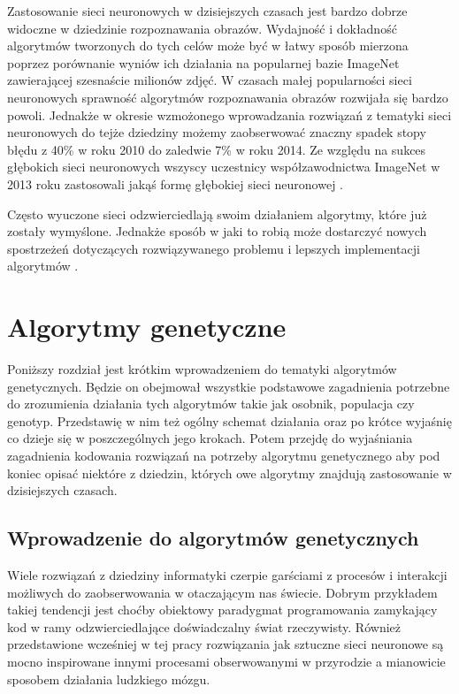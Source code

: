 \documentclass[12pt, oneside, a4paper]{report}
\begin{document}
Zastosowanie sieci neuronowych w dzisiejszych czasach jest bardzo dobrze widoczne w dziedzinie rozpoznawania obrazów. Wydajność i dokładność algorytmów tworzonych do tych celów może być w łatwy sposób mierzona poprzez porównanie wyniów ich działania na popularnej bazie ImageNet \citep{image-net} zawierającej szesnaście milionów zdjęć. W czasach małej popularności sieci neuronowych sprawność algorytmów rozpoznawania obrazów rozwijała się bardzo powoli. Jednakże w okresie wzmożonego wprowadzania rozwiązań z tematyki sieci neuronowych do tejże dziedziny możemy zaobserwować znaczny spadek stopy błędu z 40\% w roku 2010 do zaledwie 7\% w roku 2014. Ze względu na sukces głębokich sieci neuronowych wszyscy uczestnicy współzawodnictwa ImageNet w 2013 roku zastosowali jakąś formę głębokiej sieci neuronowej \citep{roelants2017deeplearning}.

Często wyuczone sieci odzwierciedlają swoim działaniem algorytmy, które już zostały wymyślone. Jednakże sposób w jaki to robią może dostarczyć nowych spostrzeżeń dotyczących rozwiązywanego problemu i lepszych implementacji algorytmów \citep{murray1995applications}.



\chapter{Algorytmy genetyczne}

Poniższy rozdział jest krótkim wprowadzeniem do tematyki algorytmów genetycznych. Będzie on obejmował wszystkie podstawowe zagadnienia potrzebne do zrozumienia działania tych algorytmów takie jak osobnik, populacja czy genotyp. Przedstawię w nim też ogólny schemat działania oraz po krótce wyjaśnię co dzieje się w poszczególnych jego krokach. Potem przejdę do wyjaśniania zagadnienia kodowania rozwiązań na potrzeby algorytmu genetycznego aby pod koniec opisać niektóre z dziedzin, których owe algorytmy znajdują zastosowanie w dzisiejszych czasach.

\section{Wprowadzenie do algorytmów genetycznych}

Wiele rozwiązań z dziedziny informatyki czerpie garściami z procesów i interakcji możliwych do zaobserwowania w otaczającym nas świecie. Dobrym przykładem takiej tendencji jest choćby obiektowy paradygmat programowania zamykający kod w ramy odzwierciedlające doświadczalny świat rzeczywisty. Również przedstawione wcześniej w tej pracy rozwiązania jak sztuczne sieci neuronowe są mocno inspirowane innymi procesami obserwowanymi w przyrodzie a mianowicie sposobem działania ludzkiego mózgu. 
\end{document}
